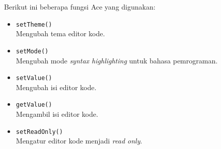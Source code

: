 Berikut ini beberapa fungsi Ace yang digunakan:
\begin{itemize}
    \item \verb|setTheme()| \\ Mengubah tema editor kode.
    \item \verb|setMode()| \\ Mengubah mode \textit{syntax highlighting} untuk bahasa pemrograman.
    \item \verb|setValue()| \\ Mengubah isi editor kode.
    \item \verb|getValue()| \\ Mengambil isi editor kode.
    \item \verb|setReadOnly()| \\ Mengatur editor kode menjadi \textit{read only}.
\end{itemize}



